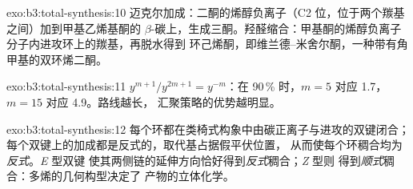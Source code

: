 \begin{solution}{exo:b3:total-synthesis:10}
迈克尔加成：二酮的烯醇负离子（C2 位，位于两个羰基之间）加到甲基乙烯基酮的
$\beta$-碳上，生成三酮。羟醛缩合：甲基酮的烯醇负离子
分子内进攻环上的羰基，再脱水得到
环己烯酮，即维兰德–米舍尔酮，一种带有角
甲基的双环烯二酮。
\end{solution}

\begin{solution}{exo:b3:total-synthesis:11}
$y^{m+1}/y^{2m+1} = y^{-m}$：在 90\,\% 时，$m = 5$ 对应 1.7，$m = 15$ 对应 4.9。路线越长，
汇聚策略的优势越明显。
\end{solution}

\begin{solution}{exo:b3:total-synthesis:12}
每个环都在类椅式构象中由碳正离子与进攻的双键闭合；
每个双键上的加成都是反式的，取代基占据假平伏位置，
从而使每个环稠合均为\textit{反式}。\textit{E} 型双键
使其两侧链的延伸方向恰好得到\textit{反式}稠合；\textit{Z} 型则
得到\textit{顺式}稠合：多烯的几何构型决定了
产物的立体化学。
\end{solution}

